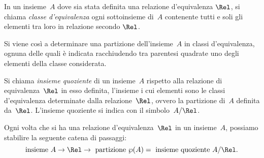 \begin{definizione}
In un insieme~$A$ dove sia stata definita una relazione d'equivalenza $\Rel$, si chiama \emph{classe d'equivalenza} ogni sottoinsieme di~$A$ contenente tutti e soli gli elementi
tra loro in relazione secondo $\Rel$.
\end{definizione}

Si viene così a determinare una partizione dell'insieme~$A$ in classi d'equivalenza, ognuna delle quali è indicata racchiudendo tra parentesi quadrate
uno degli elementi della classe considerata.

\begin{definizione}
Si chiama \emph{insieme quoziente} di un insieme~$A$ rispetto alla relazione di equivalenza~$\Rel$ in esso definita,
l'insieme i cui elementi sono le classi d'equivalenza determinate dalla relazione~$\Rel$, ovvero la partizione di~$A$ definita da~$\Rel$. L'insieme quoziente si indica con il simbolo~$A/\Rel$.
\end{definizione}

\osservazione Ogni volta che si ha una relazione d'equivalenza~$\Rel$ in un insieme~$A$, possiamo stabilire la seguente
catena di passaggi:
 \[\text{insieme }A\rightarrow\Rel\rightarrow\text{ partizione }\wp(A)=\text{ insieme quoziente }A/\Rel.\]

